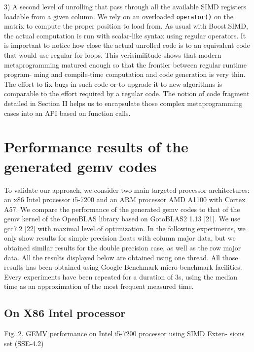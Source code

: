\documentclass[../../main.tex]{subfiles}
\begin{document}
3) A second level of unrolling that pass through all the
available SIMD registers loadable from a given column.
We rely on an overloaded \lstinline{operator()} on the matrix
to compute the proper position to load from. As usual
with Boost.SIMD, the actual computation is run with
scalar-like syntax using regular operators.
It is important to notice how close the actual unrolled code
is to an equivalent code that would use regular for loops. This
verisimilitude shows that modern metaprogramming matured
enough so that the frontier between regular runtime program-
ming and compile-time computation and code generation is
very thin. The effort to fix bugs in such code or to upgrade
it to new algorithms is comparable to the effort required
by a regular code. The notion of code fragment detailed
in Section II helps us to encapsulate those complex metaprogramming
cases into an API based on function calls.

\section{Performance results of the generated gemv codes}

To validate our approach, we consider two main targeted
processor architectures: an x86 Intel processor i5-7200 and an
ARM processor AMD A1100 with Cortex A57. We compare
the performance of the generated gemv codes to that of the
gemv kernel of the OpenBLAS library based on GotoBLAS2
1.13 [21]. We use gcc7.2 [22] with maximal level of optimization.
In the following experiments, we only show results
for simple precision floats with column major data, but we
obtained similar results for the double precision case, as well
as the row major data. All the results displayed below are
obtained using one thread. All those results has been obtained
using Google Benchmark micro-benchmark facilities. Every
experiments have been repeated for a duration of 3s, using
the median time as an approximation of the most frequent
measured time.

\subsection{On X86 Intel processor}

Fig. 2. GEMV performance on Intel i5-7200 processor using SIMD Exten-
sions set (SSE-4.2)
\end{document}

